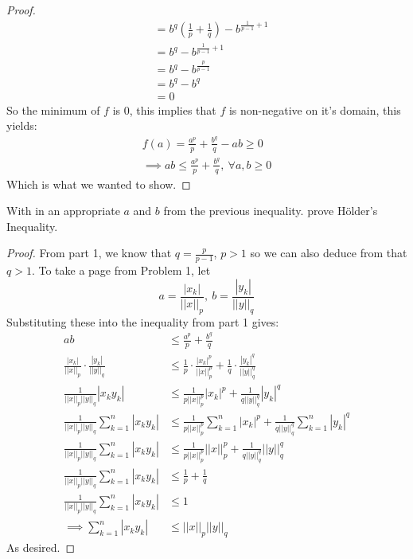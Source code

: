 \documentclass{article}
\newcommand{\norm}[1]{\left|\left|#1\right|\right|}
\newcommand{\abs}[1]{\left|#1\right|}
\newcommand{\parens}[1]{\left(#1\right)}
\begin{document}
\begin{proof}
\begin{align*}
        &= b^q\parens{\frac{1}{p} + \frac{1}{q}} - 
        b^{\frac{1}{p-1}+1} \\
        &= b^q - b^{\frac{1}{p-1}+1} \\
        &= b^q - b^{\frac{p}{p-1}} \\
        &= b^q - b^q \\
        &= 0
        \end{align*}
        So the minimum of $f$ is $0$, this implies that $f$ is 
        non-negative on it's domain, this yields:
        \begin{gather*}
        f(a) = \frac{a^p}{p} + \frac{b^q}{q} - ab \geq 0 \\
        \implies ab \leq \frac{a^p}{p} + \frac{b^q}{q},\ 
        \forall a,b \geq 0
        \end{gather*}
        Which is what we wanted to show.
        \end{proof}
        
        \item With in an appropriate $a$ and $b$ from the previous 
        inequality. prove H{\"o}lder's Inequality.
        \begin{proof}
        From part 1, we know that $q = \frac{p}{p-1}$, $p > 1$ so we 
        can also deduce from that $q > 1$. To take a page from
        Problem 1, let $$a = \frac{\abs{x_k}}{\norm{x}_p},\ b = 
        \frac{\abs{y_k}}{\norm{y}_q}$$
        Substituting these into the inequality from part 1 gives:
        \begin{align*}
        ab &\leq \frac{a^p}{p} + \frac{b^q}{q} \\
        \frac{\abs{x_k}}{\norm{x}_p}\cdot\frac{\abs{y_k}}{\norm{y}_q}
        &\leq \frac{1}{p}\cdot\frac{\abs{x_k}^p}
        {\norm{x}_p^p} + \frac{1}{q}\cdot\frac{\abs{y_k}^q}
        {\norm{y}_q^q} \\
        \frac{1}{\norm{x}_p\norm{y}_q}\abs{x_ky_k} &\leq 
        \frac{1}{p\norm{x}_p^p}\abs{x_k}^p + 
        \frac{1}{q\norm{y}_q^q}\abs{y_k}^q \\
        \frac{1}{\norm{x}_p\norm{y}_q}\sum_{k=1}^n\abs{x_ky_k} &\leq 
        \frac{1}{p\norm{x}_p^p}\sum_{k=1}^n\abs{x_k}^p + 
        \frac{1}{q\norm{y}_q^q}\sum_{k=1}^n\abs{y_k}^q \\
        \frac{1}{\norm{x}_p\norm{y}_q}\sum_{k=1}^n\abs{x_ky_k} &\leq 
        \frac{1}{p\norm{x}_p^p}\norm{x}_p^p + 
        \frac{1}{q\norm{y}_q^q}\norm{y}_q^q \\
        \frac{1}{\norm{x}_p\norm{y}_q}\sum_{k=1}^n\abs{x_ky_k} &\leq 
        \frac{1}{p} + \frac{1}{q} \\
        \frac{1}{\norm{x}_p\norm{y}_q}\sum_{k=1}^n\abs{x_ky_k} &\leq 
        1 \\
        \implies \sum_{k=1}^n \abs{x_ky_k} &\leq \norm{x}_p\norm{y}_q
        \end{align*}
        As desired.
        \end{proof}
        
\end{document}
